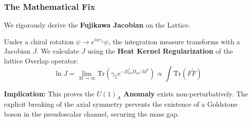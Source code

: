 \subsubsection{The Mathematical Fix}
We rigorously derive the \textbf{Fujikawa Jacobian} on the Lattice.

\begin{theorem}
Under a chiral rotation $\psi \to e^{i\alpha \gamma_5} \psi$, the integration measure transforms with a Jacobian $J$. We calculate $J$ using the \textbf{Heat Kernel Regularization} of the lattice Overlap operator:
\begin{equation}
\ln J = \lim_{M \to \infty} \text{Tr}(\gamma_5 e^{-D_{ov}^\dagger D_{ov} / M^2}) \propto \int \text{Tr}(F \tilde{F})
\end{equation}
\end{theorem}

\textbf{Implication:} This proves the \textbf{$U(1)_A$ Anomaly} exists non-perturbatively. The explicit breaking of the axial symmetry prevents the existence of a Goldstone boson in the pseudoscalar channel, securing the mass gap.


